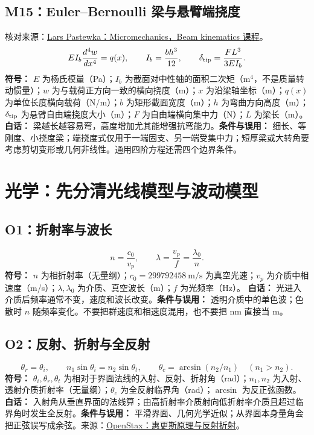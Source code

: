\documentclass[UTF8,zihao=-4,openany,oneside,fontset=windows]{ctexbook}
\begin{document}
\subsection{M15：Euler--Bernoulli 梁与悬臂端挠度}
核对来源：\href{https://pastewka.github.io/Micromechanics/lecture/chapter04.html}{Lars Pastewka：Micromechanics，Beam kinematics 课程}。
\begin{equation}
EI_b\frac{d^4w}{dx^4}=q(x),\qquad I_b=\frac{bh^3}{12},\qquad \delta_{\rm tip}=\frac{FL^3}{3EI_b}.
\end{equation}
\textbf{符号：} $E$ 为杨氏模量（Pa）；$I_b$ 为截面对中性轴的面积二次矩（m$^4$，不是质量转动惯量）；$w$ 为与载荷正方向一致的横向挠度（m）；$x$ 为沿梁轴坐标（m）；$q(x)$ 为单位长度横向载荷（N/m）；$b$ 为矩形截面宽度（m）；$h$ 为弯曲方向高度（m）；$\delta_{\rm tip}$ 为悬臂自由端挠度大小（m）；$F$ 为自由端横向集中力（N）；$L$ 为梁长（m）。
\textbf{白话：} 梁越长越容易弯，高度增加尤其能增强抗弯能力。\textbf{条件与误用：} 细长、等刚度、小挠度梁；端挠度式仅用于一端固支、另一端受集中力；短厚梁或大转角要考虑剪切变形或几何非线性。通用四阶方程还需四个边界条件。

\section{光学：先分清光线模型与波动模型}
\subsection{O1：折射率与波长}
\begin{equation}
n=\frac{c_0}{v_p},\qquad \lambda=\frac{v_p}{f}=\frac{\lambda_0}{n}.
\end{equation}
\textbf{符号：} $n$ 为相折射率（无量纲）；$c_0=299792458\ \mathrm{m/s}$ 为真空光速；$v_p$ 为介质中相速度（m/s）；$\lambda,\lambda_0$ 为介质、真空波长（m）；$f$ 为光频率（Hz）。
\textbf{白话：} 光进入介质后频率通常不变，速度和波长改变。\textbf{条件与误用：} 透明介质中的单色波；色散时 $n$ 随频率变化。不要把群速度和相速度混用，也不要把 nm 直接当 m。

\subsection{O2：反射、折射与全反射}
\begin{equation}
\theta_r=\theta_i,\qquad n_1\sin\theta_i=n_2\sin\theta_t,\qquad \theta_c=\arcsin(n_2/n_1)\quad(n_1>n_2).
\end{equation}
\textbf{符号：} $\theta_i,\theta_r,\theta_t$ 为相对于界面法线的入射、反射、折射角（rad）；$n_1,n_2$ 为入射、透射介质折射率（无量纲）；$\theta_c$ 为全反射临界角（rad）；$\arcsin$ 为反正弦函数。
\textbf{白话：} 入射角从垂直界面的法线算；由高折射率介质射向低折射率介质且超过临界角时发生全反射。\textbf{条件与误用：} 平滑界面、几何光学近似；从界面本身量角会把正弦误写成余弦。来源：\href{https://openstax.org/books/university-physics-volume-3/pages/1-6-huygenss-principle}{OpenStax：惠更斯原理与反射折射}。
\end{document}
